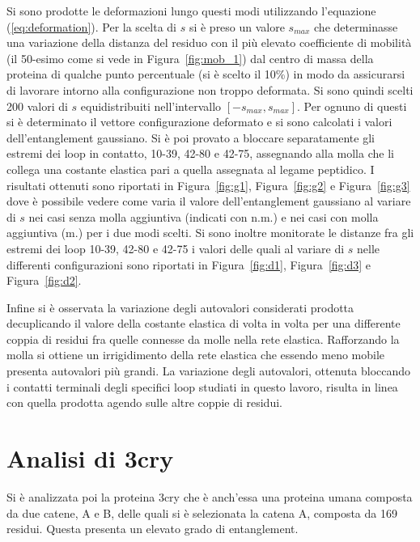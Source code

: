 Si sono prodotte le deformazioni lungo questi modi utilizzando l'equazione (\ref{eq:deformation}). Per la scelta di $ s $ si è preso un valore $ s_{max} $ che determinasse una variazione della distanza del residuo con il più elevato coefficiente di mobilità (il 50-esimo come si vede in Figura~\ref{fig:mob_1}) dal centro di massa della proteina di qualche punto percentuale (si è scelto il 10\%) in modo da assicurarsi di lavorare intorno alla configurazione non troppo deformata. Si sono quindi scelti 200 valori di $ s $ equidistribuiti nell'intervallo $ [-s_{max} , s_{max}] $. Per ognuno di questi si è determinato il vettore configurazione deformato e si sono calcolati i valori dell'entanglement gaussiano. 
Si è poi provato a bloccare separatamente gli estremi dei loop in contatto, 10-39, 42-80 e 42-75, assegnando alla molla che li collega una costante elastica pari a quella assegnata al legame peptidico.
I risultati ottenuti sono riportati in Figura~\ref{fig:g1}, Figura~\ref{fig:g2} e Figura~\ref{fig:g3} dove è possibile vedere come varia il valore dell'entanglement gaussiano al variare di $ s $ nei casi senza molla aggiuntiva (indicati con n.m.) e nei casi con molla aggiuntiva (m.) per i due modi scelti. Si sono inoltre monitorate le distanze fra gli estremi dei loop 10-39, 42-80 e 42-75 i valori delle quali al variare di $ s $ nelle differenti configurazioni sono riportati in Figura~\ref{fig:d1}, Figura~\ref{fig:d3} e Figura~\ref{fig:d2}. 

Infine si è osservata la variazione degli autovalori considerati prodotta decuplicando il valore della costante elastica di volta in volta per una differente coppia di residui fra quelle connesse da molle nella rete elastica. Rafforzando la molla si ottiene un irrigidimento della rete elastica che essendo meno mobile presenta autovalori più grandi. La variazione degli autovalori, ottenuta bloccando i contatti terminali degli specifici loop studiati in questo lavoro, risulta in linea con quella prodotta agendo sulle altre coppie di residui.

\section{Analisi di 3cry}
Si è analizzata poi la proteina 3cry che è anch'essa una proteina umana composta da due catene, A e B, delle quali si è selezionata la catena A, composta da 169 residui. Questa presenta un elevato grado di entanglement. 

